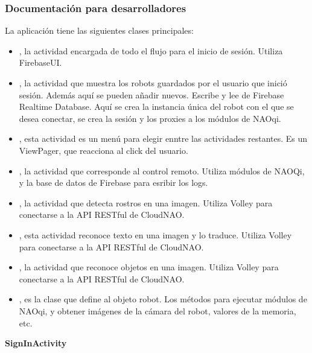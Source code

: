 \subsubsection{Documentación para desarrolladores}
\label{\detokenize{dev_docs:documentacion-para-desarrolladores}}
La aplicación tiene las siguientes clases principales:
\begin{itemize}
\item {} 
, la actividad encargada de todo el flujo para el inicio de sesión. Utiliza FirebaseUI.

\item {} 
, la actividad que muestra los robots guardados por el usuario que inició sesión. Además aquí se pueden añadir nuevos. Escribe y lee de Firebase Realtime Database. Aquí se crea la instancia única del robot con el que se desea conectar, se crea la sesión y los proxies a los módulos de NAOqi.

\item {} 
, esta actividad es un menú para elegir enntre las actividades restantes. Es un ViewPager, que reacciona al click del usuario.

\item {} 
, la actividad que corresponde al control remoto. Utiliza módulos de NAOQi, y la base de datos de Firebase para esribir los logs.

\item {} 
, la actividad que detecta rostros en una imagen. Utiliza Volley para conectarse a la API RESTful de CloudNAO.

\item {} 
, esta actividad reconoce texto en una imagen y lo traduce. Utiliza Volley para conectarse a la API RESTful de CloudNAO.

\item {} 
, la actividad que reconoce objetos en una imagen. Utiliza Volley para conectarse a la API RESTful de CloudNAO.

\item {} 
, es la clase que define al objeto robot. Los métodos para ejecutar módulos de NAOqi, y obtener imágenes de la cámara del robot, valores de la memoria, etc.

\end{itemize}


\textbf{SignInActivity}
\label{\detokenize{dev_docs:signinactivity}}

